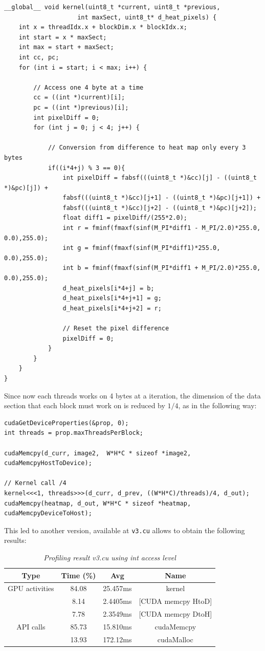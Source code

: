\documentclass[paper=a4, fontsize=10pt]{scrartcl}	%
\begin{document}
	\begin{lstlisting}[style=CStyle]
__global__ void kernel(uint8_t *current, uint8_t *previous,
					int maxSect, uint8_t* d_heat_pixels) {
	int x = threadIdx.x + blockDim.x * blockIdx.x;
	int start = x * maxSect;
	int max = start + maxSect;
	int cc, pc;
	for (int i = start; i < max; i++) {
		
		// Access one 4 byte at a time
		cc = ((int *)current)[i];
		pc = ((int *)previous)[i];
		int pixelDiff = 0;
		for (int j = 0; j < 4; j++) {
			
			// Conversion from difference to heat map only every 3 bytes
			if((i*4+j) % 3 == 0){
				int pixelDiff = fabsf(((uint8_t *)&cc)[j] - ((uint8_t *)&pc)[j]) +
				fabsf(((uint8_t *)&cc)[j+1] - ((uint8_t *)&pc)[j+1]) +
				fabsf(((uint8_t *)&cc)[j+2] - ((uint8_t *)&pc)[j+2]);
				float diff1 = pixelDiff/(255*2.0);
				int r = fminf(fmaxf(sinf(M_PI*diff1 - M_PI/2.0)*255.0, 0.0),255.0);
				int g = fminf(fmaxf(sinf(M_PI*diff1)*255.0, 0.0),255.0);
				int b = fminf(fmaxf(sinf(M_PI*diff1 + M_PI/2.0)*255.0, 0.0),255.0);
				d_heat_pixels[i*4+j] = b;
				d_heat_pixels[i*4+j+1] = g;
				d_heat_pixels[i*4+j+2] = r;
				
				// Reset the pixel difference
				pixelDiff = 0;
			}
		}
	}
}\end{lstlisting}
	Since now each threads works on 4 bytes at a iteration, the dimension of the data section that each block must work on is reduced by $1/4$, as in the following way:
		\begin{lstlisting}[style=CStyle]
cudaGetDeviceProperties(&prop, 0);
int threads = prop.maxThreadsPerBlock;

cudaMemcpy(d_curr, image2,  W*H*C * sizeof *image2, cudaMemcpyHostToDevice);

// Kernel call /4
kernel<<<1, threads>>>(d_curr, d_prev, ((W*H*C)/threads)/4, d_out);
cudaMemcpy(heatmap, d_out, W*H*C * sizeof *heatmap, cudaMemcpyDeviceToHost);\end{lstlisting}

	This led to another version, available at \texttt{v3.cu} allows to obtain the following results:
	\begin{table}[H]
		\centering
		\begin{center}
			\begin{tabular}{ |c|c|c|c| } 
				\hline
				\textbf{Type} & \textbf{Time} (\%) & \textbf{Avg} & \textbf{Name} \\ 
				\hline
				GPU activities & 84.08 & 25.457ms & kernel \\ 
				& 8.14 & 2.4405ms & [CUDA memcpy HtoD] \\ 
				& 7.78 & 2.3549ms & [CUDA memcpy DtoH] \\ 
				\hline
				API calls & 85.73 & 15.810ms & cudaMemcpy \\ 
				& 13.93 & 172.12ms & cudaMalloc \\ 
				\hline
			\end{tabular}
		\end{center}
		\label{fig:table_v3}
		\caption{\textit{Profiling result v3.cu using int access level}}
	\end{table}
	
\end{document}
